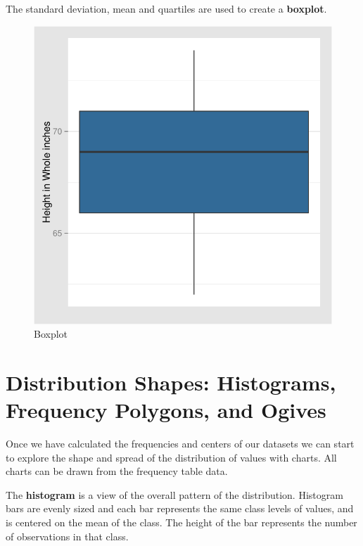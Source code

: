\documentclass[nohyper,justified]{tufte-handout}\usepackage[]{graphicx}\usepackage[]{color}
\makeatletter
\def\maxwidth{ %
  \ifdim\Gin@nat@width>\linewidth
    \linewidth
  \else
    \Gin@nat@width
  \fi
}
\newenvironment{knitrout}{}{} %
\makeatother
\begin{document}
The standard deviation, mean and quartiles are used to create a \textbf{boxplot}.

\begin{knitrout}
\color{fgcolor}\begin{figure}[h!]

{\centering \includegraphics[width=\maxwidth]{figure/graphics-boxplot-1} 

}

\caption[Boxplot]{Boxplot}\label{fig:boxplot}
\end{figure}


\end{knitrout}

\section{Distribution Shapes: Histograms, Frequency Polygons, and Ogives}

Once we have calculated the frequencies and centers of our datasets we can start to explore the shape and spread of the distribution of values with charts. All charts can be drawn from the frequency table data.

The \textbf{histogram} is a view of the overall pattern of the distribution. Histogram bars are evenly sized and each bar represents the same class levels of values, and is centered on the mean of the class. The height of the bar represents the number of observations in that class.
\end{document}
